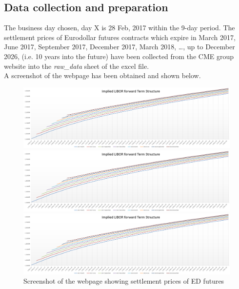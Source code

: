 \subsection{Data collection and preparation}
The business day chosen, day X is 28 Feb, 2017 within the 9-day period. The settlement prices of Eurodollar futures contracts which expire in March 2017, June 2017, September 2017, December 2017, March 2018, \dots , up to December 2026, (i.e. 10 years into the future) have been collected from the CME group website into the \emph{raw\_data} sheet of the excel file.\\
A screenshot of the webpage has been obtained and shown below.
\begin{figure}[h]
  \centering
  \begin{minipage}[h]{0.32\textwidth}
    \includegraphics[width=\textwidth]{biu.PNG}
  \end{minipage}
  \hfill
  \begin{minipage}[h]{0.32\textwidth}
    \includegraphics[width=\textwidth]{biu.PNG}
  \end{minipage}
  \hfill
  \begin{minipage}[h]{0.32\textwidth}
    \includegraphics[width=\textwidth]{biu.PNG}
  \end{minipage}
	\caption{Screenshot of the webpage showing settlement prices of ED futures}
\end{figure}

